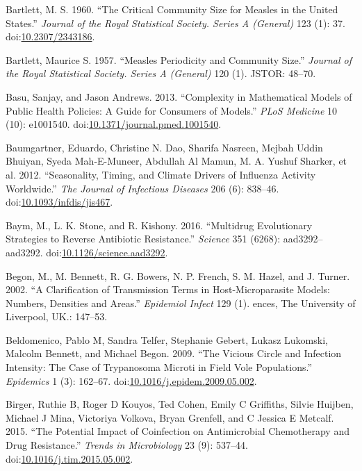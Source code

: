 \documentclass[]{book}
\theoremstyle{definition}
\theoremstyle{definition}
\theoremstyle{definition}
\theoremstyle{remark}
\begin{document}
\hypertarget{ref-bartlett60}{}
Bartlett, M. S. 1960. ``The Critical Community Size for Measles in the
United States.'' \emph{Journal of the Royal Statistical Society. Series
A (General)} 123 (1): 37.
doi:\href{https://doi.org/10.2307/2343186}{10.2307/2343186}.

\hypertarget{ref-bartlett57}{}
Bartlett, Maurice S. 1957. ``Measles Periodicity and Community Size.''
\emph{Journal of the Royal Statistical Society. Series A (General)} 120
(1). JSTOR: 48--70.

\hypertarget{ref-basu13}{}
Basu, Sanjay, and Jason Andrews. 2013. ``Complexity in Mathematical
Models of Public Health Policies: A Guide for Consumers of Models.''
\emph{PLoS Medicine} 10 (10): e1001540.
doi:\href{https://doi.org/10.1371/journal.pmed.1001540}{10.1371/journal.pmed.1001540}.

\hypertarget{ref-baumgartner12}{}
Baumgartner, Eduardo, Christine N. Dao, Sharifa Nasreen, Mejbah Uddin
Bhuiyan, Syeda Mah-E-Muneer, Abdullah Al Mamun, M. A. Yushuf Sharker, et
al. 2012. ``Seasonality, Timing, and Climate Drivers of Influenza
Activity Worldwide.'' \emph{The Journal of Infectious Diseases} 206 (6):
838--46.
doi:\href{https://doi.org/10.1093/infdis/jis467}{10.1093/infdis/jis467}.

\hypertarget{ref-baym16}{}
Baym, M., L. K. Stone, and R. Kishony. 2016. ``Multidrug Evolutionary
Strategies to Reverse Antibiotic Resistance.'' \emph{Science} 351
(6268): aad3292--aad3292.
doi:\href{https://doi.org/10.1126/science.aad3292}{10.1126/science.aad3292}.

\hypertarget{ref-begon02}{}
Begon, M., M. Bennett, R. G. Bowers, N. P. French, S. M. Hazel, and J.
Turner. 2002. ``A Clarification of Transmission Terms in
Host-Microparasite Models: Numbers, Densities and Areas.''
\emph{Epidemiol Infect} 129 (1). ences, The University of Liverpool,
UK.: 147--53.

\hypertarget{ref-beldomenico09}{}
Beldomenico, Pablo M, Sandra Telfer, Stephanie Gebert, Lukasz Lukomski,
Malcolm Bennett, and Michael Begon. 2009. ``The Vicious Circle and
Infection Intensity: The Case of Trypanosoma Microti in Field Vole
Populations.'' \emph{Epidemics} 1 (3): 162--67.
doi:\href{https://doi.org/10.1016/j.epidem.2009.05.002}{10.1016/j.epidem.2009.05.002}.

\hypertarget{ref-birger15}{}
Birger, Ruthie B, Roger D Kouyos, Ted Cohen, Emily C Griffiths, Silvie
Huijben, Michael J Mina, Victoriya Volkova, Bryan Grenfell, and C
Jessica E Metcalf. 2015. ``The Potential Impact of Coinfection on
Antimicrobial Chemotherapy and Drug Resistance.'' \emph{Trends in
Microbiology} 23 (9): 537--44.
doi:\href{https://doi.org/10.1016/j.tim.2015.05.002}{10.1016/j.tim.2015.05.002}.
\end{document}

